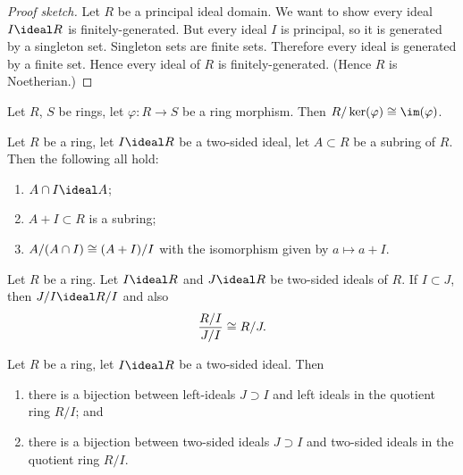 \begin{proof}[Proof sketch]
Let $R$ be a principal ideal domain. We want to show every ideal
$I\ideal R$ is finitely-generated. But every ideal $I$ is principal,
so it is generated by a singleton set. Singleton sets are finite sets.
Therefore every ideal is generated by a finite set. Hence every ideal
of $R$ is finitely-generated. (Hence $R$ is Noetherian.)
\end{proof}

\begin{theorem}
Let $R$, $S$ be rings, let $\varphi\colon R\to S$ be a ring morphism.
Then $R/\ker(\varphi)\iso\im(\varphi)$.
\end{theorem}

\begin{theorem}
Let $R$ be a ring, let $I\ideal R$ be a two-sided ideal, let $A\subset R$
be a subring of $R$. Then the following all hold:
\begin{enumerate}
\item $A\cap I\ideal A$;
\item $A+I\subset R$ is a subring;
\item $A/(A\cap I)\cong (A+I)/I$ with the isomorphism given by
  $a\mapsto a+I$.
\end{enumerate}
\end{theorem}

\begin{theorem}
Let $R$ be a ring. Let $I\ideal R$ and $J\ideal R$ be two-sided ideals
of $R$. If $I\subset J$, then $J/I\ideal R/I$ and also
\begin{equation}
\frac{R/I}{J/I}\iso R/J.
\end{equation}
\end{theorem}

\begin{theorem}
Let $R$ be a ring, let $I\ideal R$ be a two-sided ideal. Then
\begin{enumerate}
\item there is a bijection between left-ideals $J\supset I$ and left
  ideals in the quotient ring $R/I$; and
\item there is a bijection between two-sided ideals $J\supset I$ and
  two-sided ideals in the quotient ring $R/I$.
\end{enumerate}
\end{theorem}


